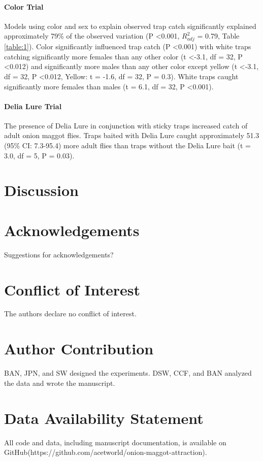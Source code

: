 \documentclass[alpha-refs]{wiley-article}
\begin{document}
\paragraph{Color Trial} Models using color and sex to explain observed trap catch significantly explained approximately 79\% of the observed variation (P \textless 0.001, $R^2_{adj}$ = 0.79, Table \ref{table:1}). Color significantly influenced trap catch (P \textless 0.001) with white traps catching significantly more females than any other color (t \textless -3.1, df = 32, P \textless 0.012) and significantly more males than any other color except yellow (t \textless -3.1, df = 32, P \textless 0.012, Yellow: t = -1.6, df = 32, P = 0.3).  White traps caught significantly more females than males (t = 6.1, df = 32, P \textless 0.001).

\paragraph{Delia Lure Trial} The presence of Delia Lure in conjunction with sticky traps increased catch of adult onion maggot flies.  Traps baited with Delia Lure caught approximately 51.3 (95\% CI: 7.3-95.4) more adult flies than traps without the Delia Lure bait (t = 3.0, df = 5, P = 0.03).


\section{Discussion}


\section*{Acknowledgements}
Suggestions for acknowledgements?

\section*{Conflict of Interest}
The authors declare no conflict of interest.  

\section*{Author Contribution}
BAN, JPN, and SW designed the experiments.  DSW, CCF, and BAN analyzed the data and wrote the manuscript.  


\section*{Data Availability Statement}
All code and data, including manuscript documentation, is available on GitHub(https://github.com/acetworld/onion-maggot-attraction).
\end{document}
